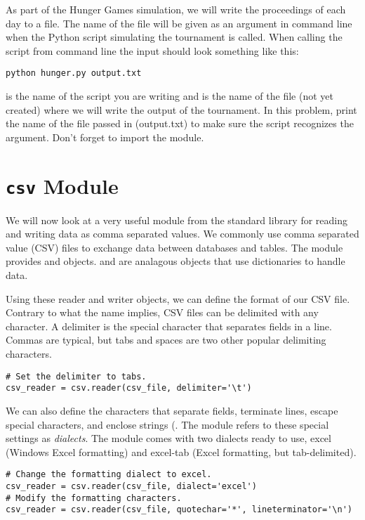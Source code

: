\begin{problem}
As part of the Hunger Games simulation, we will write the proceedings of each day to a file. The name of the file will be given as an argument in command line when the Python script simulating the tournament is called. When calling the script from command line the input should look something like this:

\begin{lstlisting}[style=ShellOutput]
python hunger.py output.txt
\end{lstlisting}

 is the name of the script you are writing and  is the name of the file (not yet created) where we will write the output of the tournament. In this problem, print the name of the file passed in (output.txt) to make sure the script recognizes the argument. Don't forget to import the  module.
\label{prob:prob2}
\end{problem}


\section*{\texttt{csv} Module}
We will now look at a very useful module from the standard library for reading and writing data as comma separated values. We commonly use comma separated value (CSV) files to exchange data between databases and tables.
The  module provides  and  objects.  and  are analagous objects that use dictionaries to handle data.

Using these reader and writer objects, we can define the format of our CSV file.
Contrary to what the name implies, CSV files can be delimited with any character.
A delimiter is the special character that separates fields in a line. Commas are typical, but tabs and spaces are two other popular delimiting characters.
\begin{lstlisting}
# Set the delimiter to tabs.
csv_reader = csv.reader(csv_file, delimiter='\t')
\end{lstlisting}

We can also define the characters that separate fields, terminate lines, escape special characters, and enclose strings (.
The  module refers to these special settings as \emph{dialects}.
The module comes with two dialects ready to use, excel (Windows Excel formatting) and excel-tab (Excel formatting, but tab-delimited).
\begin{lstlisting}
# Change the formatting dialect to excel.
csv_reader = csv.reader(csv_file, dialect='excel')
# Modify the formatting characters.
csv_reader = csv.reader(csv_file, quotechar='*', lineterminator='\n')

\end{lstlisting}

